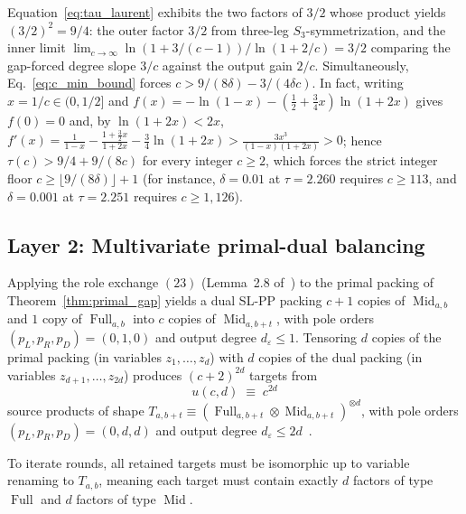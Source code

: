 \documentclass[11pt,a4paper]{article}
\theoremstyle{plain}
\theoremstyle{definition}
\theoremstyle{remark}
\DeclareMathOperator{\Full}{Full}
\DeclareMathOperator{\Mid}{Mid}
\begin{document}
Equation~\eqref{eq:tau_laurent} exhibits the two factors of $3/2$ whose product yields $(3/2)^2 = 9/4$: the outer factor $3/2$ from three-leg $S_3$-symmetrization, and the inner limit $\lim_{c \to \infty} \ln(1 + 3/(c-1))/\ln(1 + 2/c) = 3/2$ comparing the gap-forced degree slope $3/c$ against the output gain $2/c$. Simultaneously, Eq.~\eqref{eq:c_min_bound} forces $c > 9/(8\delta) - 3/(4\delta c)$. In fact, writing $x = 1/c \in (0, 1/2]$ and $f(x) = -\ln(1 - x) - (\frac{1}{2} + \frac{3}{4}x)\ln(1 + 2x)$ gives $f(0) = 0$ and, by $\ln(1 + 2x) < 2x$, $f'(x) = \frac{1}{1 - x} - \frac{1 + \frac{3}{2}x}{1 + 2x} - \frac{3}{4}\ln(1 + 2x) > \frac{3 x^3}{(1 - x)(1 + 2x)} > 0$; hence $\tau(c) > 9/4 + 9/(8c)$ for every integer $c \ge 2$, which forces the strict integer floor $c \ge \lfloor 9/(8\delta)\rfloor + 1$ (for instance, $\delta = 0.01$ at $\tau = 2.260$ requires $c \ge 113$, and $\delta = 0.001$ at $\tau = 2.251$ requires $c \ge 1{,}126$).

\subsection{Layer 2: Multivariate primal-dual balancing}
\label{subsec:layer2}

Applying the role exchange $(23)$ (Lemma~2.8 of~\cite{Pass2026}) to the primal packing of Theorem~\ref{thm:primal_gap} yields a dual SL-PP packing $c + 1$ copies of $\Mid_{a,b}$ and $1$ copy of $\Full_{a,b}$ into $c$ copies of $\Mid_{a, b+t}$, with pole orders $(p_L, p_R, p_D) = (0, 1, 0)$ and output degree $d_\varepsilon \le 1$. Tensoring $d$ copies of the primal packing (in variables $z_1, \dots, z_d$) with $d$ copies of the dual packing (in variables $z_{d+1}, \dots, z_{2d}$) produces $(c + 2)^{2d}$ targets from
\begin{equation}
    u(c, d) \;\equiv\; c^{2d}
    \label{eq:u_def}
\end{equation}
source products of shape $T_{a, b+t} \equiv (\Full_{a, b+t} \otimes \Mid_{a, b+t})^{\otimes d}$, with pole orders $(p_L, p_R, p_D) = (0, d, d)$ and output degree $d_\varepsilon \le 2d$~\cite[Lemma~3.2]{Pass2026}.

To iterate rounds, all retained targets must be isomorphic up to variable renaming to $T_{a,b}$, meaning each target must contain exactly $d$ factors of type $\Full$ and $d$ factors of type $\Mid$.
\end{document}
